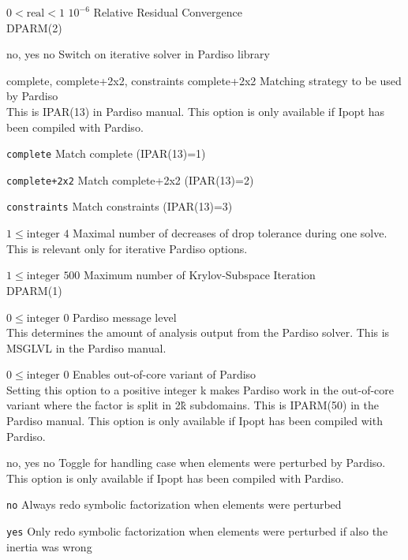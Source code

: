 %
{$0<\textrm{real}<1$}%
{$10^{- 6}$}%
{Relative Residual Convergence\\
DPARM(2)}%
{}

%
{no, yes}%
{no}%
{Switch on iterative solver in Pardiso library}%
{}

%
{complete, complete+2x2, constraints}%
{complete+2x2}%
{Matching strategy to be used by Pardiso\\
This is IPAR(13) in Pardiso manual.  This option is only available if Ipopt has been compiled with Pardiso.}%
{\begin{list}{}{
\setlength{\parsep}{0em}
\setlength{\leftmargin}{5ex}
\setlength{\labelwidth}{2ex}
\setlength{\itemindent}{0ex}
\setlength{\topsep}{0pt}}
\item[\texttt{complete}] Match complete (IPAR(13)=1)
\item[\texttt{complete+2x2}] Match complete+2x2 (IPAR(13)=2)
\item[\texttt{constraints}] Match constraints (IPAR(13)=3)
\end{list}
}

%
{$1\leq\textrm{integer}$}%
{$4$}%
{Maximal number of decreases of drop tolerance during one solve.\\
This is relevant only for iterative Pardiso options.}%
{}

%
{$1\leq\textrm{integer}$}%
{$500$}%
{Maximum number of Krylov-Subspace Iteration\\
DPARM(1)}%
{}

%
{$0\leq\textrm{integer}$}%
{$0$}%
{Pardiso message level\\
This determines the amount of analysis output from the Pardiso solver. This is MSGLVL in the Pardiso manual.}%
{}

%
{$0\leq\textrm{integer}$}%
{$0$}%
{Enables out-of-core variant of Pardiso\\
Setting this option to a positive integer k makes Pardiso work in the out-of-core variant where the factor is split in 2\^k subdomains.  This is IPARM(50) in the Pardiso manual.  This option is only available if Ipopt has been compiled with Pardiso.}%
{}

%
{no, yes}%
{no}%
{Toggle for handling case when elements were perturbed by Pardiso.\\
This option is only available if Ipopt has been compiled with Pardiso.}%
{\begin{list}{}{
\setlength{\parsep}{0em}
\setlength{\leftmargin}{5ex}
\setlength{\labelwidth}{2ex}
\setlength{\itemindent}{0ex}
\setlength{\topsep}{0pt}}
\item[\texttt{no}] Always redo symbolic factorization when elements were perturbed
\item[\texttt{yes}] Only redo symbolic factorization when elements were perturbed if also the inertia was wrong
\end{list}
}


